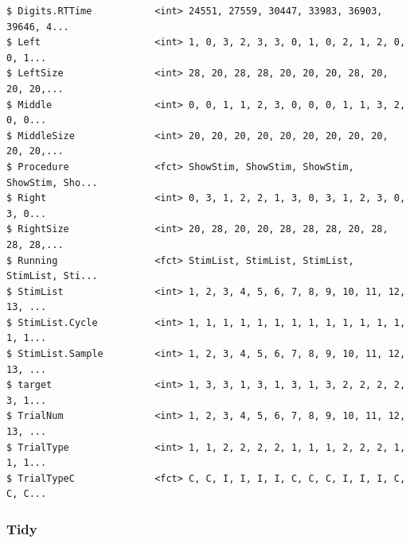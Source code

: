 \documentclass{article}\usepackage[]{graphicx}\usepackage[]{color}
\makeatletter
\newenvironment{kframe}{%
 \def\at@end@of@kframe{}%
 \ifinner\ifhmode%
  \def\at@end@of@kframe{\end{minipage}}%
  \begin{minipage}{\columnwidth}%
 \fi\fi%
 \def\FrameCommand##1{\hskip\@totalleftmargin \hskip-\fboxsep
 \colorbox{shadecolor}{##1}\hskip-\fboxsep
     \hskip-\linewidth \hskip-\@totalleftmargin \hskip\columnwidth}%
 \MakeFramed {\advance\hsize-\width
   \@totalleftmargin\z@ \linewidth\hsize
   \@setminipage}}%
 {\par\unskip\endMakeFramed%
 \at@end@of@kframe}
\newenvironment{knitrout}{}{} %
\makeatother
\begin{document}
\begin{knitrout}
\begin{kframe}
\begin{verbatim}
$ Digits.RTTime           <int> 24551, 27559, 30447, 33983, 36903, 39646, 4...
$ Left                    <int> 1, 0, 3, 2, 3, 3, 0, 1, 0, 2, 1, 2, 0, 0, 1...
$ LeftSize                <int> 28, 20, 28, 28, 20, 20, 20, 28, 20, 20, 20,...
$ Middle                  <int> 0, 0, 1, 1, 2, 3, 0, 0, 0, 1, 1, 3, 2, 0, 0...
$ MiddleSize              <int> 20, 20, 20, 20, 20, 20, 20, 20, 20, 20, 20,...
$ Procedure               <fct> ShowStim, ShowStim, ShowStim, ShowStim, Sho...
$ Right                   <int> 0, 3, 1, 2, 2, 1, 3, 0, 3, 1, 2, 3, 0, 3, 0...
$ RightSize               <int> 20, 28, 20, 20, 28, 28, 28, 20, 28, 28, 28,...
$ Running                 <fct> StimList, StimList, StimList, StimList, Sti...
$ StimList                <int> 1, 2, 3, 4, 5, 6, 7, 8, 9, 10, 11, 12, 13, ...
$ StimList.Cycle          <int> 1, 1, 1, 1, 1, 1, 1, 1, 1, 1, 1, 1, 1, 1, 1...
$ StimList.Sample         <int> 1, 2, 3, 4, 5, 6, 7, 8, 9, 10, 11, 12, 13, ...
$ target                  <int> 1, 3, 3, 1, 3, 1, 3, 1, 3, 2, 2, 2, 2, 3, 1...
$ TrialNum                <int> 1, 2, 3, 4, 5, 6, 7, 8, 9, 10, 11, 12, 13, ...
$ TrialType               <int> 1, 1, 2, 2, 2, 2, 1, 1, 1, 2, 2, 2, 1, 1, 1...
$ TrialTypeC              <fct> C, C, I, I, I, I, C, C, C, I, I, I, C, C, C...
\end{verbatim}
\end{kframe}
\end{knitrout}

\subsubsection{Tidy}
\end{document}
